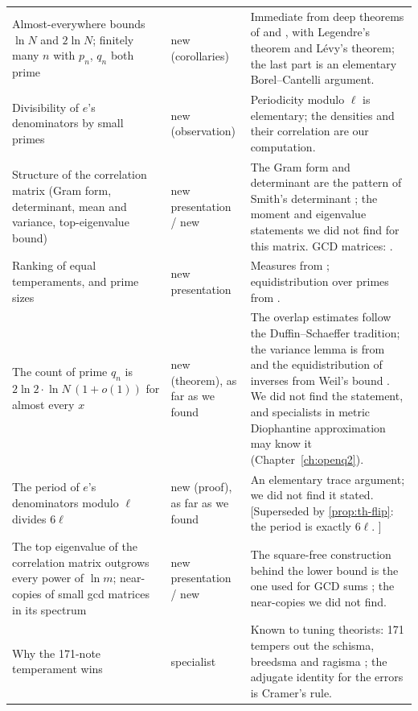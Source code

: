 \begin{longtable}{p{}p{}p{}}
Almost-everywhere bounds $\ln N$ and $2\ln N$; finitely many $n$ with $p_n$, $q_n$ both prime \addedon{\revA} & new (corollaries) & Immediate from deep theorems of \citet{Erdos1970} and \citet{KMY2024}, with Legendre's theorem and Lévy's theorem; the last part is an elementary Borel--Cantelli argument. \\
Divisibility of $e$'s denominators by small primes \addedon{\revA} & new (observation) & Periodicity modulo $\ell$ is elementary; the densities and their correlation are our computation. \\
Structure of the correlation matrix (Gram form, determinant, mean and variance, top-eigenvalue bound) \addedon{\revA} & new presentation / new & The Gram form and determinant are the pattern of Smith's determinant \citep{Smith1875}; the moment and eigenvalue statements we did not find for this matrix. GCD matrices: \citet{LindqvistSeip1998,HongLoewy2004}. \\
Ranking of equal temperaments, and prime sizes \addedon{\revA} & new presentation & Measures from \citet{Erlich2006}; equidistribution over primes from \citet{Vinogradov1954}. \\
The count of prime $q_n$ is $2\ln 2\cdot\ln N\,(1 + o(1))$ for almost every $x$ \addedon{\revB} & new (theorem), as far as we found & The overlap estimates follow the Duffin--Schaeffer tradition; the variance lemma is from \citet{Harman1998} and the equidistribution of inverses from Weil's bound \citep{Weil1948}. We did not find the statement, and specialists in metric Diophantine approximation may know it (Chapter~\ref{ch:openq2}). \\
The period of $e$'s denominators modulo $\ell$ divides $6\ell$ \addedon{\revB} & new (proof), as far as we found & An elementary trace argument; we did not find it stated. [Superseded by \cref{prop:th-flip}: the period is exactly $6\ell$. \addedon{\revC}] \\
The top eigenvalue of the correlation matrix outgrows every power of $\ln m$; near-copies of small gcd matrices in its spectrum \addedon{\revB} & new presentation / new & The square-free construction behind the lower bound is the one used for GCD sums \citep{AistleitnerBerkesSeip2015,BondarenkoSeip2015}; the near-copies we did not find. \\
Why the 171-note temperament wins \addedon{\revB} & specialist & Known to tuning theorists: 171 tempers out the schisma, breedsma and ragisma \citep{Xen171,XenEnnealimmal}; the adjugate identity for the errors is Cramer's rule. \\

\end{longtable}
